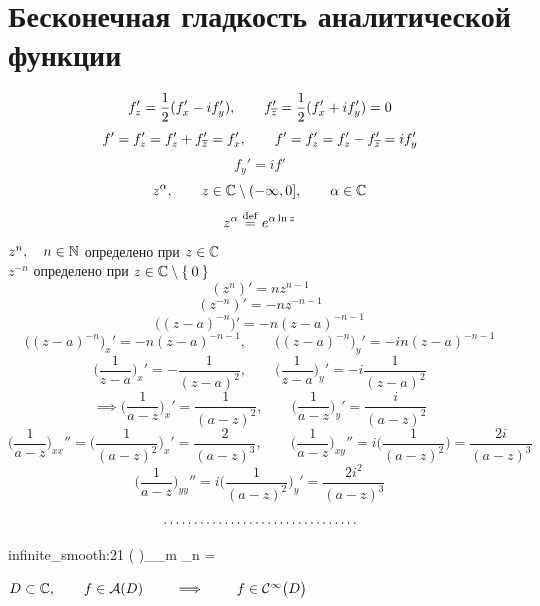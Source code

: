 \section{Бесконечная гладкость аналитической функции}

\begin{remark}
	$$ f_z' = \frac12(f_x' - if_y'), \qquad f_{\ol z}' = \frac12(f_x' + if_y') = 0 $$
	$$ f' = f_z' = f'_z + f_{\ol z}' = f_x', \qquad f' = f_z' = f_z' - f_{\ol z}' = if_y' $$
	$$ f_y' = if' $$
	$$ z^\alpha, \qquad z \in \Co \setminus (-\infty, 0], \qquad \alpha \in \Co $$
	$$ z^\alpha \bydef e^{\alpha \ln z} $$
	$ z^n, \quad n \in \N $ определено при $ z \in \Co $ \\
	$ z^{-n} $ определено при $ z \in \Co \setminus \set 0 $
	$$ (z^n)' = nz^{n - 1} $$
	$$ (z^{-n})' = -nz^{-n - 1} $$
	$$ \bigg( (z - a)^{-n} \bigg)' = -n(z - a)^{-n - 1} $$
	$$ \bigg( (z - a)^{-n} \bigg)_x' = -n(z - a)^{-n - 1}, \qquad \bigg( (z - a)^{-n} \bigg)_y' = -in(z - a)^{-n - 1} $$
	$$ \bigg( \frac1{z - a} \bigg)_x' = - \frac1{(z - a)^2}, \qquad \bigg( \frac1{z - a} \bigg)_y' = -i \frac1{(z - a)^2} $$
	$$ \implies \bigg( \frac1{a - z} \bigg)_x' = \frac1{(a - z)^2}, \qquad \bigg( \frac1{a - z} \bigg)_y' = \frac{i}{(a - z)^2} $$
	$$ \bigg( \frac1{a - z} \bigg)_{xx}'' = \bigg( \frac1{(a - z)^2} \bigg)_x' = \frac2{(a - z)^3}, \qquad \bigg( \frac1{a - z} \bigg)_{xy}'' = i \bigg( \frac1{(a - z)^2} \bigg) = \frac{2i}{(a - z)^3} $$
	$$ \bigg( \frac1{a - z} \bigg)_{yy}'' = i \bigg( \frac1{(a - z)^2} \bigg)_y' = \frac{2i^2}{(a - z)^3} $$
	$$ \widedots[5cm] $$
	\begin{equ}{infinite_smooth:21}
		\bigg(  \bigg)_{_m _n} = 
	\end{equ}
\end{remark}

\begin{theorem}
	$ D \sub \Co, \qquad f \in \mathcal A (D) \qquad \implies \qquad f \in \Cont[\infty] D $
\end{theorem}


